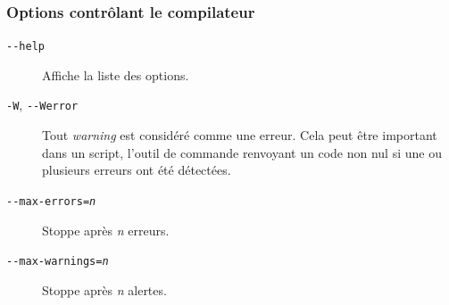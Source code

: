 \subsubsection{Options contrôlant le compilateur}




\begin{description}
  \item[\texttt{-{-}help}] Affiche la liste des options.

  \item[\texttt{-W}, \texttt{-{-}Werror}] Tout \emph{warning} est considéré comme une erreur. Cela peut être important dans un script, l’outil de commande renvoyant un code non nul si une ou plusieurs erreurs ont été détectées.

  \item[\texttt{-{-}max-errors=\emph{n}}] Stoppe après \emph{n} erreurs.

  \item[\texttt{-{-}max-warnings=\emph{n}}] Stoppe après \emph{n} alertes.

\end{description}





